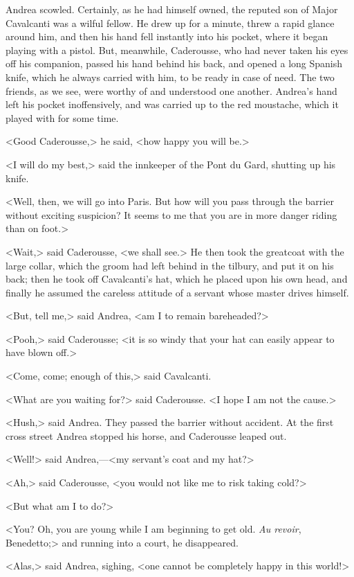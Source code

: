  Andrea scowled. Certainly, as he had himself owned, the reputed son of Major Cavalcanti was a wilful fellow. He drew up for a minute, threw a rapid glance around him, and then his hand fell instantly into his pocket, where it began playing with a pistol. But, meanwhile, Caderousse, who had never taken his eyes off his companion, passed his hand behind his back, and opened a long Spanish knife, which he always carried with him, to be ready in case of need. The two friends, as we see, were worthy of and understood one another. Andrea's hand left his pocket inoffensively, and was carried up to the red moustache, which it played with for some time. 

 <Good Caderousse,> he said, <how happy you will be.> 

 <I will do my best,> said the innkeeper of the Pont du Gard, shutting up his knife. 

 <Well, then, we will go into Paris. But how will you pass through the barrier without exciting suspicion? It seems to me that you are in more danger riding than on foot.> 

 <Wait,> said Caderousse, <we shall see.> He then took the greatcoat with the large collar, which the groom had left behind in the tilbury, and put it on his back; then he took off Cavalcanti's hat, which he placed upon his own head, and finally he assumed the careless attitude of a servant whose master drives himself. 

 <But, tell me,> said Andrea, <am I to remain bareheaded?> 

 <Pooh,> said Caderousse; <it is so windy that your hat can easily appear to have blown off.> 

 <Come, come; enough of this,> said Cavalcanti. 

 <What are you waiting for?> said Caderousse. <I hope I am not the cause.> 

 <Hush,> said Andrea. They passed the barrier without accident. At the first cross street Andrea stopped his horse, and Caderousse leaped out. 

 <Well!> said Andrea,—<my servant's coat and my hat?> 

 <Ah,> said Caderousse, <you would not like me to risk taking cold?> 

 <But what am I to do?> 

 <You? Oh, you are young while I am beginning to get old. \textit{Au revoir}, Benedetto;> and running into a court, he disappeared. 

 <Alas,> said Andrea, sighing, <one cannot be completely happy in this world!> 